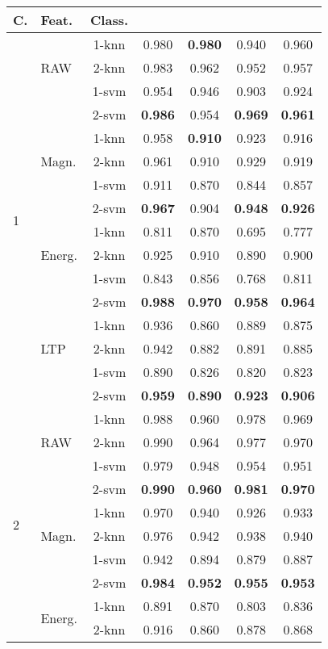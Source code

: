 \documentclass[twocolumn]{svjour3}          \smartqed  \usepackage[draft]{hyperref}
\begin{document}
\begin{table}[tb]
\scriptsize
\centering
\begin{tabular}{llccccc}
C.&	Feat.&Class.	&	 &	 &		&	 \\
\hline \multirow{16}{*}{1}	&\multirow{3}{*}{RAW}	&1-knn&	0.980&	\bf{0.980}&	0.940&	0.960\\ 
&&2-knn&	0.983&	0.962&	0.952&	0.957\\ 
&&1-svm&	0.954&	0.946&	0.903&	0.924\\ 
&&2-svm&	\bf{0.986}&	0.954&	\bf{0.969}&	\bf{0.961}\\ 
[2pt] 
&\multirow{3}{*}{Magn.}	&1-knn&	0.958&	\bf{0.910}&	0.923&	0.916\\ 
&&2-knn&	0.961&	0.910&	0.929&	0.919\\ 
&&1-svm&	0.911&	0.870&	0.844&	0.857\\ 
&&2-svm&	\bf{0.967}&	0.904&	\bf{0.948}&	\bf{0.926}\\ 
[2pt] 
&\multirow{3}{*}{Energ.}	&1-knn&	0.811&	0.870&	0.695&	0.777\\ 
&&2-knn&	0.925&	0.910&	0.890&	0.900\\ 
&&1-svm&	0.843&	0.856&	0.768&	0.811\\ 
&&2-svm&\bf{0.988}&	\bf{0.970}&	\bf{0.958}&	\bf{0.964}\\ 
[2pt] 
&\multirow{3}{*}{LTP}	&1-knn&	0.936&	0.860&	0.889&	0.875\\ 
&&2-knn&	0.942&	0.882&	0.891&	0.885\\ 
&&1-svm&	0.890&	0.826&	0.820&	0.823\\ 
&&2-svm &\bf{0.959}&	\bf{0.890}&	\bf{0.923}&	\bf{0.906}\\ 
[2pt] 
\hline 
\multirow{16}{*}{2}	&\multirow{3}{*}{RAW}	&1-knn&	0.988&	0.960&	0.978&	0.969\\ 
&&2-knn&	0.990&	0.964&	0.977&	0.970\\ 
&&1-svm&	0.979&	0.948&	0.954&	0.951\\ 
&&2-svm&\bf{0.990}&	\bf{0.960}&	\bf{0.981}&	\bf{0.970}\\ 
[2pt] 
&\multirow{3}{*}{Magn.}	&1-knn&	0.970&	0.940&	0.926&	0.933\\ 
&&2-knn&	0.976&	0.942&	0.938&	0.940\\ 
&&1-svm&	0.942&	0.894&	0.879&	0.887\\ 
&&2-svm&	\bf{0.984}&	\bf{0.952}&	\bf{0.955}&	\bf{0.953}\\ 
[2pt] 
&\multirow{3}{*}{Energ.}	&1-knn&	0.891&	0.870&	0.803&	0.836\\ 
&&2-knn&	0.916&	0.860&	0.878&	0.868\\ 

\end{tabular}
\end{table}
\end{document}
